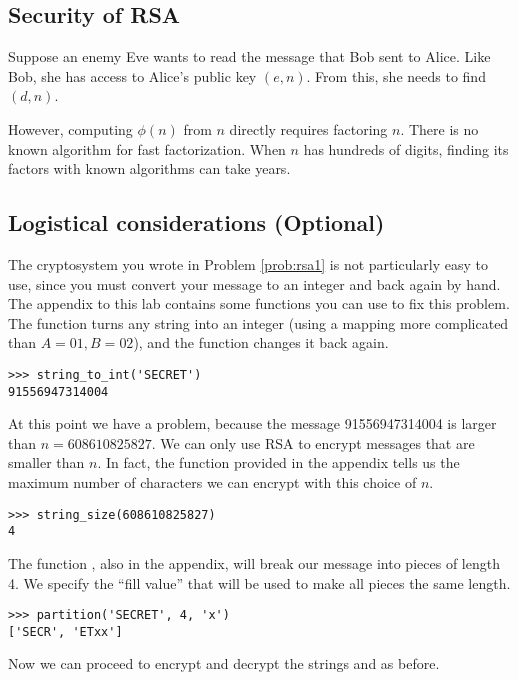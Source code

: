 \subsection*{Security of RSA}
Suppose an enemy Eve wants to read the message that Bob sent to Alice.
Like Bob, she has access to Alice's public key $(e, n)$.
From this, she needs to find $(d, n)$.

However, computing $\phi(n)$ from $n$ directly requires factoring $n$.
There is no known algorithm for fast factorization. 
When $n$ has hundreds of digits, finding its factors with known algorithms can take years.



\subsection*{Logistical considerations (Optional)}
The cryptosystem you wrote in Problem \ref{prob:rsa1} is not particularly easy to use, since you must convert your message to an integer and back again by hand.
The appendix to this lab contains some functions you can use to fix this problem.
The function  turns any string into an integer (using a mapping more complicated than $A=01, B=02$), and the function  changes it back again.

\begin{lstlisting}
>>> string_to_int('SECRET')
91556947314004
\end{lstlisting}

At this point we have a problem, because the message 91556947314004 is larger than $n=608610825827$.
We can only use RSA to encrypt messages that are smaller than $n.$
In fact, the function  provided in the appendix tells us the maximum number of characters we can encrypt with this choice of $n$.

\begin{lstlisting}
>>> string_size(608610825827)
4
\end{lstlisting}

The function , also in the appendix, will break our message into pieces of length 4.
We specify the ``fill value''  that will be used to make all pieces the same length.

\begin{lstlisting}
>>> partition('SECRET', 4, 'x')
['SECR', 'ETxx']
\end{lstlisting}
Now we can proceed to encrypt and decrypt the strings  and  as before.

